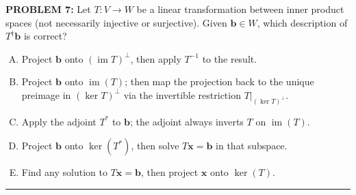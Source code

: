\documentclass[12pt]{amsart}
\newcommand{\divider}{
  \vspace{-1em} %
  \noindent
  \raisebox{-0.15ex}{\textbullet}%
  \hspace{0.5em}%
  \rule[0.5ex]{0.95\textwidth}{1.0pt}%
  \hspace{0.5em}%
  \raisebox{-0.15ex}{\textbullet}%
  \vspace{0em} %
}
\begin{document}
{\bf PROBLEM 7:}
%
Let $T: V \to W$ be a linear transformation between inner product spaces (not necessarily injective or surjective). Given $\mathbf{b} \in W$, which description of $T^\dagger \mathbf{b}$ is correct?

\begin{enumerate}[(A)]
\item Project $\mathbf{b}$ onto $(\operatorname{im} T)^\perp$, then apply $T^{-1}$ to the result.
\item Project $\mathbf{b}$ onto $\operatorname{im}(T)$; then map the projection back to the unique preimage in $(\ker T)^\perp$ via the invertible restriction $T\big|_{(\ker T)^\perp}$.
\item Apply the adjoint $T^*$ to $\mathbf{b}$; the adjoint always inverts $T$ on $\operatorname{im}(T)$.
\item Project $\mathbf{b}$ onto $\ker(T^*)$, then solve $T\mathbf{x} = \mathbf{b}$ in that subspace.
\item Find any solution to $T\mathbf{x} = \mathbf{b}$, then project $\mathbf{x}$ onto $\ker(T)$.
\end{enumerate}
%
%
\divider
\end{document}
